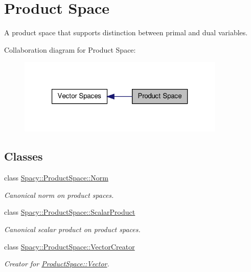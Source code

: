 \hypertarget{group__ProductSpaceGroup}{\section{\-Product \-Space}
\label{group__ProductSpaceGroup}
}


\-A product space that supports distinction between primal and dual variables.  


\-Collaboration diagram for \-Product \-Space\-:
\nopagebreak
\begin{figure}[H]
\begin{center}
\leavevmode
\includegraphics[width=280pt]{group__ProductSpaceGroup}
\end{center}
\end{figure}
\subsection*{\-Classes}
\begin{DoxyCompactItemize}
\item 
class \hyperlink{classSpacy_1_1ProductSpace_1_1Norm}{\-Spacy\-::\-Product\-Space\-::\-Norm}
\begin{DoxyCompactList}\small\item\em \-Canonical norm on product spaces. \end{DoxyCompactList}\item 
class \hyperlink{classSpacy_1_1ProductSpace_1_1ScalarProduct}{\-Spacy\-::\-Product\-Space\-::\-Scalar\-Product}
\begin{DoxyCompactList}\small\item\em \-Canonical scalar product on product spaces. \end{DoxyCompactList}\item 
class \hyperlink{classSpacy_1_1ProductSpace_1_1VectorCreator}{\-Spacy\-::\-Product\-Space\-::\-Vector\-Creator}
\begin{DoxyCompactList}\small\item\em \-Creator for \hyperlink{classSpacy_1_1ProductSpace_1_1Vector}{\-Product\-Space\-::\-Vector}. \end{DoxyCompactList}\end{DoxyCompactItemize}
